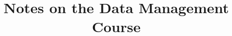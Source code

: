 \documentclass[a4paper,12pt]{report}
\begin{document}
\title{Notes on the Data Management Course}
\author{}
\date{}

\maketitle




\end{document}
